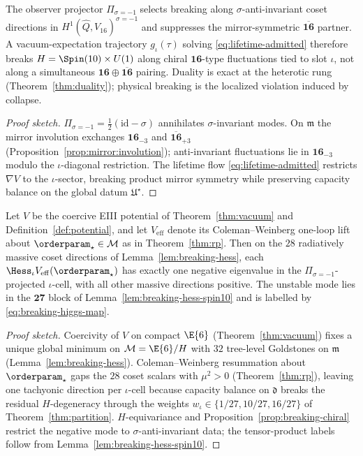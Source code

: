 \begin{proposition}\label{prop:breaking-chiral}
The observer projector $\Pi_{\sigma=-1}$ selects breaking along
$\sigma$-anti-invariant coset directions in
$H^1(\hat Q,V_{16})^{\sigma=-1}$ and suppresses the mirror-symmetric
$\overline{\mathbf{16}}$ partner. A vacuum-expectation trajectory $g_\iota(\tau)$
solving \eqref{eq:lifetime-admitted} therefore breaks
$H=\Spin(10)\times U(1)$ along chiral $\mathbf{16}$-type fluctuations tied to
slot $\iota$, not along a simultaneous
$\mathbf{16}\oplus\overline{\mathbf{16}}$ pairing. Duality is exact at the
heterotic rung (Theorem~\ref{thm:duality}); physical breaking is the localized
violation induced by collapse.
\end{proposition}

\begin{proof}[Proof sketch]
$\Pi_{\sigma=-1}=\tfrac12(\mathrm{id}-\sigma)$ annihilates $\sigma$-invariant
modes. On $\mathfrak{m}$ the mirror involution exchanges
$\mathbf{16}_{-3}$ and $\overline{\mathbf{16}}_{+3}$
(Proposition~\ref{prop:mirror:involution}); anti-invariant fluctuations lie in
$\mathbf{16}_{-3}$ modulo the $\iota$-diagonal restriction. The lifetime flow
\eqref{eq:lifetime-admitted} restricts $\nabla V$ to the $\iota$-sector,
breaking product mirror symmetry while preserving capacity balance on the global
datum $\mathfrak{U}^\star$.
\end{proof}

\begin{lemma}
\label{lem:breaking-cw}
Let $V$ be the coercive EIII potential of Theorem~\ref{thm:vacuum}
and Definition~\ref{def:potential}, and let $V_{\mathrm{eff}}$ denote its Coleman--Weinberg
one-loop lift about $\orderparam_\star\in\mathcal{M}$ as in
Theorem~\ref{thm:rp}. Then on the $28$ radiatively massive coset directions of
Lemma~\ref{lem:breaking-hess}, each $\Hess_\iota V_{\mathrm{eff}}(\orderparam_\star)$
has exactly one negative eigenvalue in the
$\Pi_{\sigma=-1}$-projected $\iota$-cell, with all other massive directions
positive. The unstable mode lies in the $\mathbf{27}$ block of
Lemma~\ref{lem:breaking-hess-spin10} and is labelled by
\eqref{eq:breaking-higgs-map}.
\end{lemma}

\begin{proof}[Proof sketch]
Coercivity of $V$ on compact $\E{6}$ (Theorem~\ref{thm:vacuum}) fixes a unique
global minimum on $\mathcal{M}=\E{6}/H$ with $32$ tree-level Goldstones on
$\mathfrak{m}$ (Lemma~\ref{lem:breaking-hess}). Coleman--Weinberg resummation
about $\orderparam_\star$ gaps the $28$ coset scalars with $\mu^2>0$
(Theorem~\ref{thm:rp}), leaving one tachyonic direction per $\iota$-cell because
capacity balance on $\mathfrak{d}$ breaks the residual $H$-degeneracy through
the weights $w_\iota\in\{1/27,10/27,16/27\}$ of Theorem~\ref{thm:partition}.
$H$-equivariance and Proposition~\ref{prop:breaking-chiral} restrict the
negative mode to $\sigma$-anti-invariant data; the tensor-product labels follow
from Lemma~\ref{lem:breaking-hess-spin10}.
\end{proof}

